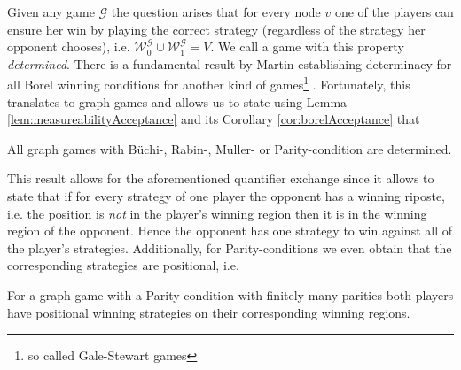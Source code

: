 Given any game $\mathcal{G}$ the question arises that for every node $v$ one of
the players can ensure her win by playing the correct strategy (regardless of
the strategy her opponent chooses), i.e.
$\mathcal{W}^{\mathcal{G}}_{0}\cup\mathcal{W}^{\mathcal{G}}_{1} = V$. We call
a game with this property \emph{determined}. There is a fundamental result by
Martin establishing determinacy for all Borel winning conditions for another 
kind of games\footnote{so called Gale-Stewart games} \cite{BorelDeterminacy}. 
Fortunately, this translates to graph games and allows us to state using Lemma 
\ref{lem:measureabilityAcceptance} and its Corollary \ref{cor:borelAcceptance}
that
\begin{theorem}
  \cite[Corollary 2.10]{AutoLogInfGames}
  All graph games with Büchi-, Rabin-, Muller- or Parity-condition are 
  determined.
  \label{thm:boreldet}
\end{theorem}
This result allows for the aforementioned quantifier exchange since it allows
to state that if for every strategy of one player the opponent has a winning
riposte, i.e. the position is \emph{not} in the player's winning region then it
is in the winning region of the opponent. Hence the opponent has one strategy
to win against all of the player's strategies. Additionally, for 
Parity-conditions we even obtain that the corresponding strategies are 
positional, i.e.
\begin{theorem}
  \cite[Theorem 6]{ParityGamesPosDet}
  For a graph game with a Parity-condition with finitely many parities both 
  players have positional winning strategies on their corresponding winning 
  regions.
  \label{thm:posdetparity}
\end{theorem}

